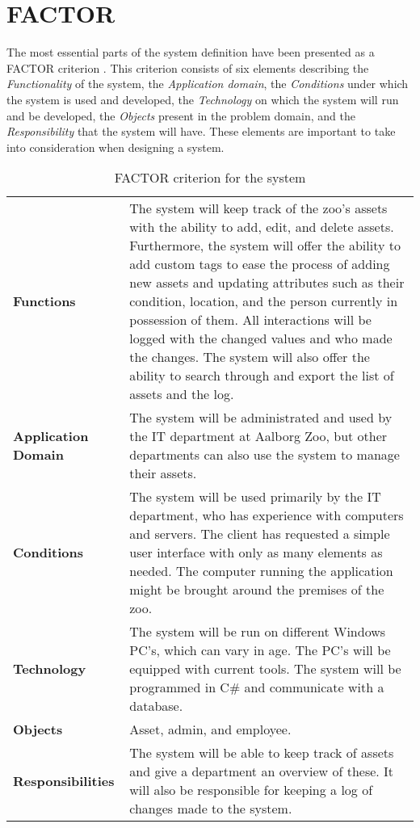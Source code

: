 \chapter{FACTOR} \label{app:factor}
The most essential parts of the system definition have been presented as a FACTOR criterion \citep{OOAD}. This criterion consists of six elements describing the \textit{Functionality} of the system, the \textit{Application domain}, the \textit{Conditions} under which the system is used and developed, the \textit{Technology} on which the system will run and be developed, the \textit{Objects} present in the problem domain, and the \textit{Responsibility} that the system will have. These elements are important to take into consideration when designing a system.

\begin{table}[H]
    \centering
    {
    \renewcommand{\arraystretch}{2.0}
    \begin{tabular}{ m{4cm} m{10cm} }
        \hline
        
        \textbf{Functions} & The system will keep track of the zoo's assets with the ability to add, edit, and delete assets. Furthermore, the system will offer the ability to add custom tags to ease the process of adding new assets and updating attributes such as their condition, location, and the person currently in possession of them. All interactions will be logged with the changed values and who made the changes. The system will also offer the ability to search through and export the list of assets and the log.\\
        
        \textbf{Application Domain} & The system will be administrated and used by the IT department at Aalborg Zoo, but other departments can also use the system to manage their assets.\\
        
        \textbf{Conditions} & The system will be used primarily by the IT department, who has experience with computers and servers. The client has requested a simple user interface with only as many elements as needed. The computer running the application might be brought around the premises of the zoo.\\
        
        \textbf{Technology} & The system will be run on different Windows PC's, which can vary in age. The PC's will be equipped with current tools. The system will be programmed in C\# and communicate with a database.\\
        
        \textbf{Objects} & Asset, admin, and employee.\\
        
        \textbf{Responsibilities} & The system will be able to keep track of assets and give a department an overview of these. It will also be responsible for keeping a log of changes made to the system.\\
        
        \hline
    \end{tabular}
    \caption{FACTOR criterion for the system}
    \label{tab:factor}
    }
\end{table}